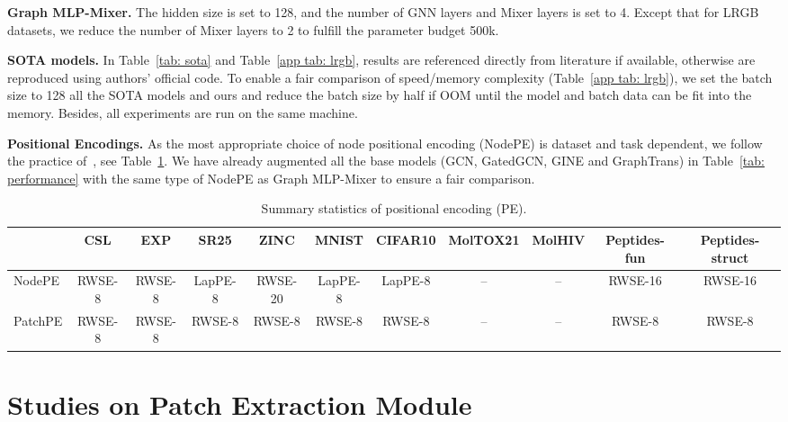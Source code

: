\documentclass{article}
\begin{document}
\textbf{Graph MLP-Mixer.}
The hidden size is set to 128, and the number of GNN layers and Mixer layers is set to 4. Except that for LRGB datasets, we reduce the number of Mixer layers to 2 to fulfill the parameter budget 500k.



\textbf{SOTA models.}
In Table~\ref{tab: sota} and Table~\ref{app tab: lrgb}, results are referenced directly from literature if available, otherwise are reproduced using authors' official code.
To enable a fair comparison of speed/memory complexity (Table~\ref{app tab: lrgb}), we set the batch size to 128 all the SOTA models and ours and reduce the batch size by half if OOM until the model and batch data can be fit into the memory. Besides, all experiments are run on the same machine.

\textbf{Positional Encodings.}
As the most appropriate choice of node positional encoding (NodePE) is dataset and task dependent, we follow the practice of~\citet{rampavsek2022recipe, dwivedi2022long}, see Table~\ref{tab: pe}. We have already augmented all the base models (GCN, GatedGCN, GINE and GraphTrans) in Table~\ref{tab: performance} with the same type of NodePE as Graph MLP-Mixer to ensure a fair comparison.
\begin{table}[!ht]
    \centering
    \scriptsize
    \caption{Summary statistics of positional encoding (PE).}
    \begin{tabular}{lcccccccccc}
    \toprule
          &  CSL & EXP& SR25 & ZINC & MNIST & CIFAR10 &MolTOX21 & MolHIV & Peptides-fun & Peptides-struct\\
         \midrule
         NodePE 
         & RWSE-8 & RWSE-8 & LapPE-8 
         &RWSE-20 & LapPE-8 & LapPE-8
         & -- & --
         & RWSE-16 & RWSE-16 \\
         PatchPE 
         & RWSE-8 & RWSE-8 & RWSE-8 & RWSE-8
         & RWSE-8 & RWSE-8
         & -- & --
         & RWSE-8 & RWSE-8 \\
         \bottomrule
    \end{tabular}
    \label{tab: pe}
\end{table}



\section{Studies on Patch Extraction Module}\label{app sec: patch extraction}
\end{document}
